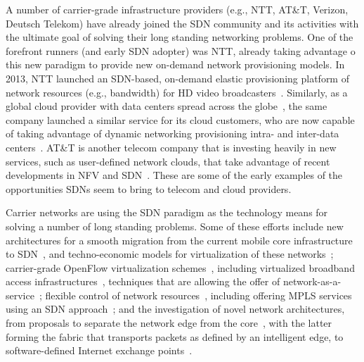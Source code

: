 A number of carrier-grade infrastructure providers (e.g., NTT, AT\&T, Verizon, Deutsch Telekom) have already joined the SDN community and its activities with the ultimate goal of solving their long standing networking problems.
One of the forefront runners (and early SDN adopter) was NTT, already taking advantage o this new paradigm to provide new on-demand network provisioning models.
In 2013, NTT launched an SDN-based, on-demand elastic provisioning platform of network resources (e.g., bandwidth) for HD video broadcasters~\cite{bernier2013}. 
Similarly, as a global cloud provider with data centers spread across the globe~\cite{nttdata2014}, the same company launched a similar service for its cloud customers, who are now capable of taking advantage of dynamic networking 
provisioning intra- and inter-data centers~\cite{wagner2014}.
AT\&T is another telecom company that is investing heavily in new services, such as user-defined network clouds, that 
take advantage of recent developments in NFV and SDN~\cite{atandtinc.2014}.
These are some of the early examples of the opportunities SDNs seem to bring to telecom and cloud providers. 

Carrier networks are using the SDN paradigm as the technology means for solving a number of long standing problems. 
Some of these efforts include 
new architectures for a smooth migration from the current mobile core infrastructure to SDN~\cite{pentikousis2013}, and techno-economic models for virtualization of these networks~\cite{naudts2012,onfsolutionbrief2013};  
carrier-grade OpenFlow virtualization schemes~\cite{skoldstrom2013,koponen}, including virtualized broadband access infrastructures~\cite{gharakheili2013}, techniques that are allowing the offer of network-as-a-service~\cite{pacnet2013}; 
flexible control of network resources~\cite{corporation2012}, including offering MPLS services using an SDN approach~\cite{das2011};
and the investigation of novel network architectures, from proposals to separate the network edge from the core~\cite{casado2012,6786608}, with the latter forming the fabric that transports packets as defined by an intelligent edge, to software-defined Internet exchange points~\cite{feamster2013,stringer2013}.



